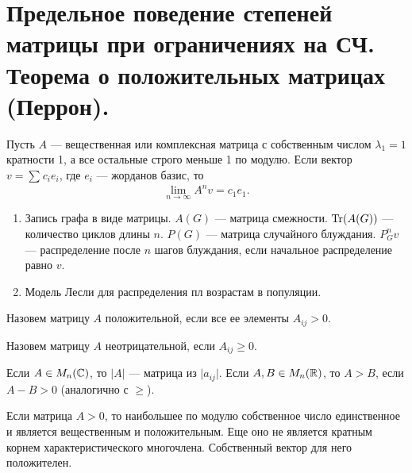 \section{Предельное поведение степеней матрицы при ограничениях на СЧ. Теорема о положительных матрицах (Перрон).}
\begin{lm}
    Пусть  $ A$ --- вещественная или комплексная матрица с собственным числом $ \lambda _1 = 1$ кратности 1, а все остальные строго меньше 1 по модулю. Если вектор $ v = \sum_{}^{} c_i e_i $, где $ e_i$ --- жорданов базис, то
     \[
    \lim_{n \to \infty} A^{n}v = c_1 e_1
    .\] 
\end{lm}

\begin{ex}
    \begin{enumerate}[noitemsep]
        \item Запись графа в виде матрицы. 
	    $ A(G)$ --- матрица смежности.  $ \operatorname{Tr} (A(G))$ --- количество циклов длины  $ n$. $ P(G)$ --- матрица случайного блуждания. $ P_{G}^{n}v$ --- распределение после $ n$ шагов блуждания, если начальное распределение равно  $ v$.
	\item Модель Лесли для распределения пл возрастам в популяции.
    \end{enumerate} 
\end{ex}

\begin{defn}
    Назовем матрицу $ A$  {\sf положительной}, если все ее элементы $ A_{ij} > 0$.  
\end{defn}
\begin{defn}
    Назовем матрицу $ A$ {\sf неотрицательной}, если $ A_{ij} \ge 0$. 
\end{defn}
\begin{name}
    Если $ A \in M_n(\mathbb{C})$, то $ \lvert A \rvert $ --- матрица из $ \lvert a_{ij} \rvert $. Если $ A, B \in M_n(\mathbb{R})$, то $ A > B$, если  $ A - B > 0$ (аналогично с  $ \ge $).
\end{name}
\begin{thm}[Перрон, 1907]
    Если матрица $ A > 0$, то наибольшее по модулю  собственное число единственное и является вещественным и положительным. Еще оно не является кратным корнем характеристического многочлена. Собственный вектор для него положителен.
\end{thm}
